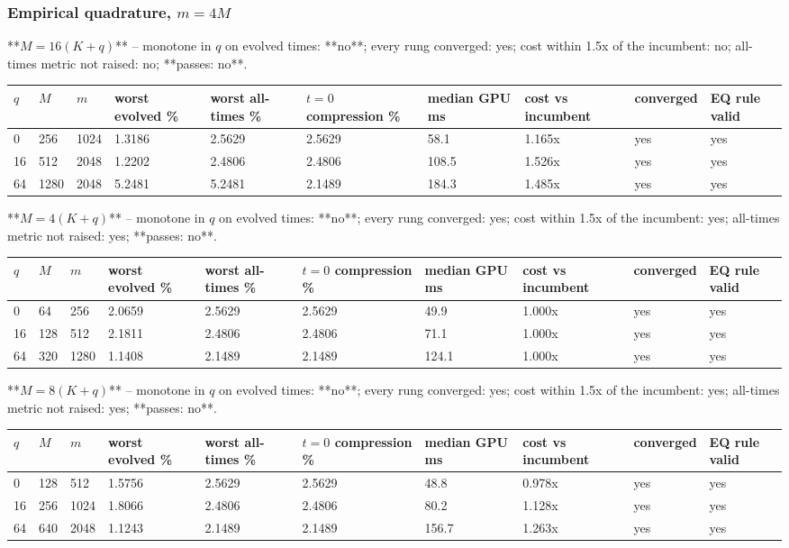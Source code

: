 \documentclass[11pt]{article}
\begin{document}
\subsubsection{Empirical quadrature, $m = 4M$}
**$M = 16(K+q)$** -- monotone in $q$ on evolved times: **no**; every rung converged: yes; cost within 1.5x of the incumbent: no; all-times metric not raised: no; **passes: no**.

\begin{table}[htbp]\centering\small
\begin{tabular}{llllllllll}\hline
$q$ & $M$ & $m$ & worst evolved \% & worst all-times \% & $t=0$ compression \% & median GPU ms & cost vs incumbent & converged & EQ rule valid \\ \hline
0 & 256 & 1024 & 1.3186 & 2.5629 & 2.5629 & 58.1 & 1.165x & yes & yes \\
16 & 512 & 2048 & 1.2202 & 2.4806 & 2.4806 & 108.5 & 1.526x & yes & yes \\
64 & 1280 & 2048 & 5.2481 & 5.2481 & 2.1489 & 184.3 & 1.485x & yes & yes \\
\hline\end{tabular}
\end{table}
**$M = 4(K+q)$** -- monotone in $q$ on evolved times: **no**; every rung converged: yes; cost within 1.5x of the incumbent: yes; all-times metric not raised: yes; **passes: no**.

\begin{table}[htbp]\centering\small
\begin{tabular}{llllllllll}\hline
$q$ & $M$ & $m$ & worst evolved \% & worst all-times \% & $t=0$ compression \% & median GPU ms & cost vs incumbent & converged & EQ rule valid \\ \hline
0 & 64 & 256 & 2.0659 & 2.5629 & 2.5629 & 49.9 & 1.000x & yes & yes \\
16 & 128 & 512 & 2.1811 & 2.4806 & 2.4806 & 71.1 & 1.000x & yes & yes \\
64 & 320 & 1280 & 1.1408 & 2.1489 & 2.1489 & 124.1 & 1.000x & yes & yes \\
\hline\end{tabular}
\end{table}
**$M = 8(K+q)$** -- monotone in $q$ on evolved times: **no**; every rung converged: yes; cost within 1.5x of the incumbent: yes; all-times metric not raised: yes; **passes: no**.

\begin{table}[htbp]\centering\small
\begin{tabular}{llllllllll}\hline
$q$ & $M$ & $m$ & worst evolved \% & worst all-times \% & $t=0$ compression \% & median GPU ms & cost vs incumbent & converged & EQ rule valid \\ \hline
0 & 128 & 512 & 1.5756 & 2.5629 & 2.5629 & 48.8 & 0.978x & yes & yes \\
16 & 256 & 1024 & 1.8066 & 2.4806 & 2.4806 & 80.2 & 1.128x & yes & yes \\
64 & 640 & 2048 & 1.1243 & 2.1489 & 2.1489 & 156.7 & 1.263x & yes & yes \\
\hline\end{tabular}
\end{table}
\end{document}

